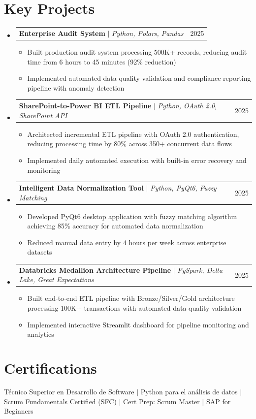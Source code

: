 \documentclass[letterpaper,11pt]{article}
\makeatletter
\newcommand{\resumeItem}[1]{
  \item\small{
    {#1 \vspace{-2pt}}
  }
}
\newcommand{\resumeProjectHeading}[2]{
    \item
    \begin{tabular*}{0.97\textwidth}{l@{\extracolsep{\fill}}r}
      \small#1 & #2 \\
    \end{tabular*}\vspace{-7pt}
}
\newcommand{\resumeSubHeadingListStart}{\begin{itemize}[leftmargin=0.15in, label={}]}
\newcommand{\resumeSubHeadingListEnd}{\end{itemize}}
\newcommand{\resumeItemListStart}{\begin{itemize}}
\newcommand{\resumeItemListEnd}{\end{itemize}\vspace{-5pt}}
\makeatother
\begin{document}
\section{Key Projects}
  \resumeSubHeadingListStart
    \resumeProjectHeading
      {\textbf{Enterprise Audit System} $|$ \emph{Python, Polars, Pandas}}{2025}
      \resumeItemListStart
        \resumeItem{Built production audit system processing 500K+ records, reducing audit time from 6 hours to 45 minutes (92\% reduction)}
        \resumeItem{Implemented automated data quality validation and compliance reporting pipeline with anomaly detection}
      \resumeItemListEnd
    \resumeProjectHeading
      {\textbf{SharePoint-to-Power BI ETL Pipeline} $|$ \emph{Python, OAuth 2.0, SharePoint API}}{2025}
      \resumeItemListStart
        \resumeItem{Architected incremental ETL pipeline with OAuth 2.0 authentication, reducing processing time by 80\% across 350+ concurrent data flows}
        \resumeItem{Implemented daily automated execution with built-in error recovery and monitoring}
      \resumeItemListEnd
    \resumeProjectHeading
      {\textbf{Intelligent Data Normalization Tool} $|$ \emph{Python, PyQt6, Fuzzy Matching}}{2025}
      \resumeItemListStart
        \resumeItem{Developed PyQt6 desktop application with fuzzy matching algorithm achieving 85\% accuracy for automated data normalization}
        \resumeItem{Reduced manual data entry by 4 hours per week across enterprise datasets}
      \resumeItemListEnd
    \resumeProjectHeading
      {\textbf{Databricks Medallion Architecture Pipeline} $|$ \emph{PySpark, Delta Lake, Great Expectations}}{2025}
      \resumeItemListStart
        \resumeItem{Built end-to-end ETL pipeline with Bronze/Silver/Gold architecture processing 100K+ transactions with automated data quality validation}
        \resumeItem{Implemented interactive Streamlit dashboard for pipeline monitoring and analytics}
      \resumeItemListEnd
  \resumeSubHeadingListEnd

\section{Certifications}
\begin{itemize}[leftmargin=0.15in, label={}]
    \small{\item{
     Técnico Superior en Desarrollo de Software $|$
     Python para el análisis de datos $|$
     Scrum Fundamentals Certified (SFC) $|$
     Cert Prep: Scrum Master $|$
     SAP for Beginners
    }}
\end{itemize}
\end{document}
